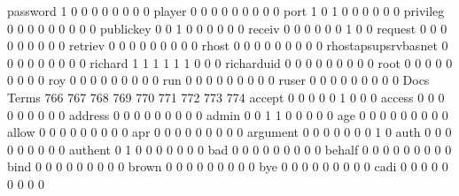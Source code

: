\documentclass[compress,8pt]{beamer}
\begin{document}
\begin{frame}
\begin{Schunk}
  password                                   1   0   0   0   0   0   0   0   0
  player                                     0   0   0   0   0   0   0   0   0
  port                                       1   0   1   0   0   0   0   0   0
  privileg                                   0   0   0   0   0   0   0   0   0
  publickey                                  0   0   1   0   0   0   0   0   0
  receiv                                     0   0   0   0   0   0   1   0   0
  request                                    0   0   0   0   0   0   0   0   0
  retriev                                    0   0   0   0   0   0   0   0   0
  rhost                                      0   0   0   0   0   0   0   0   0
  rhostapsupsrvbasnet                        0   0   0   0   0   0   0   0   0
  richard                                    1   1   1   1   1   1   0   0   0
  richarduid                                 0   0   0   0   0   0   0   0   0
  root                                       0   0   0   0   0   0   0   0   0
  roy                                        0   0   0   0   0   0   0   0   0
  run                                        0   0   0   0   0   0   0   0   0
  ruser                                      0   0   0   0   0   0   0   0   0
                                          Docs
Terms                                      766 767 768 769 770 771 772 773 774
  accept                                     0   0   0   0   0   1   0   0   0
  access                                     0   0   0   0   0   0   0   0   0
  address                                    0   0   0   0   0   0   0   0   0
  admin                                      0   0   1   1   0   0   0   0   0
  age                                        0   0   0   0   0   0   0   0   0
  allow                                      0   0   0   0   0   0   0   0   0
  apr                                        0   0   0   0   0   0   0   0   0
  argument                                   0   0   0   0   0   0   0   1   0
  auth                                       0   0   0   0   0   0   0   0   0
  authent                                    0   1   0   0   0   0   0   0   0
  bad                                        0   0   0   0   0   0   0   0   0
  behalf                                     0   0   0   0   0   0   0   0   0
  bind                                       0   0   0   0   0   0   0   0   0
  brown                                      0   0   0   0   0   0   0   0   0
  bye                                        0   0   0   0   0   0   0   0   0
  cadi                                       0   0   0   0   0   0   0   0   0

\end{Schunk}
\end{frame}
\end{document}
